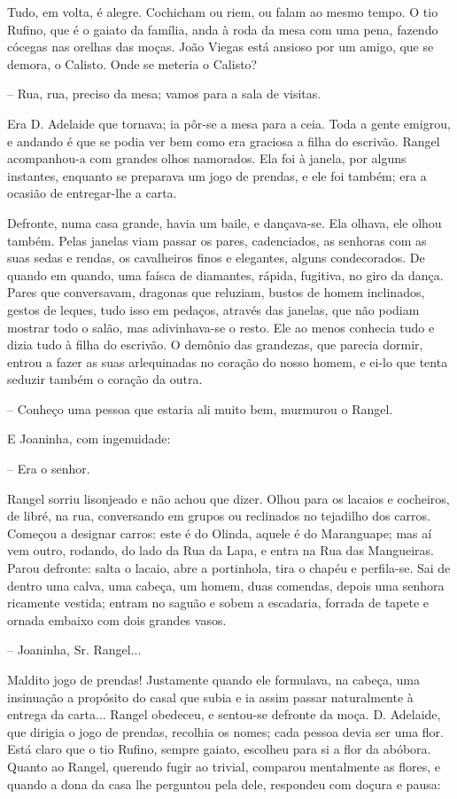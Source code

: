 Tudo, em volta, é alegre. Cochicham ou riem, ou falam ao mesmo tempo. O
tio Rufino, que é o gaiato da família, anda à roda da mesa com uma pena,
fazendo cócegas nas orelhas das moças. João Viegas está ansioso por um
amigo, que se demora, o Calisto. Onde se meteria o Calisto?

-- Rua, rua, preciso da mesa; vamos para a sala de visitas.

Era D. Adelaide que tornava; ia pôr-se a mesa para a ceia. Toda a gente
emigrou, e andando é que se podia ver bem como era graciosa a filha do
escrivão. Rangel acompanhou-a com grandes olhos namorados. Ela foi à
janela, por alguns instantes, enquanto se preparava um jogo de prendas,
e ele foi também; era a ocasião de entregar-lhe a carta.

Defronte, numa casa grande, havia um baile, e dançava-se. Ela olhava,
ele olhou também. Pelas janelas viam passar os pares, cadenciados, as
senhoras com as suas sedas e rendas, os cavalheiros finos e elegantes,
alguns condecorados. De quando em quando, uma faísca de diamantes,
rápida, fugitiva, no giro da dança. Pares que conversavam, dragonas que
reluziam, bustos de homem inclinados, gestos de leques, tudo isso em
pedaços, através das janelas, que não podiam mostrar todo o salão, mas
adivinhava-se o resto. Ele ao menos conhecia tudo e dizia tudo à filha
do escrivão. O demônio das grandezas, que parecia dormir, entrou a fazer
as suas arlequinadas no coração do nosso homem, e ei-lo que tenta
seduzir também o coração da outra.

-- Conheço uma pessoa que estaria ali muito bem, murmurou o Rangel.

E Joaninha, com ingenuidade:

-- Era o senhor.

Rangel sorriu lisonjeado e não achou que dizer. Olhou para os lacaios e
cocheiros, de libré, na rua, conversando em grupos ou reclinados no
tejadilho dos carros. Começou a designar carros: este é do Olinda,
aquele é do Maranguape; mas aí vem outro, rodando, do lado da Rua da
Lapa, e entra na Rua das Mangueiras. Parou defronte: salta o lacaio,
abre a portinhola, tira o chapéu e perfila-se. Sai de dentro uma calva,
uma cabeça, um homem, duas comendas, depois uma senhora ricamente
vestida; entram no saguão e sobem a escadaria, forrada de tapete e
ornada embaixo com dois grandes vasos.

-- Joaninha, Sr. Rangel...

Maldito jogo de prendas! Justamente quando ele formulava, na cabeça, uma
insinuação a propósito do casal que subia e ia assim passar naturalmente
à entrega da carta... Rangel obedeceu, e sentou-se defronte da moça. D.
Adelaide, que dirigia o jogo de prendas, recolhia os nomes; cada pessoa
devia ser uma flor. Está claro que o tio Rufino, sempre gaiato, escolheu
para si a flor da abóbora. Quanto ao Rangel, querendo fugir ao trivial,
comparou mentalmente as flores, e quando a dona da casa lhe perguntou
pela dele, respondeu com doçura e pausa:

